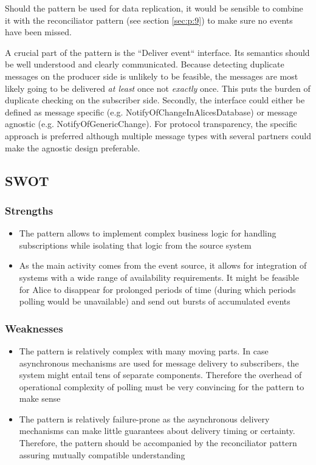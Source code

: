 \documentclass[10pt,a4paper]{article}
\begin{document}
Should the pattern be used for data replication, it would be sensible to combine it with the reconciliator pattern (see section \ref{sec:p:9}) to make sure no events have been missed.

A crucial part of the pattern is the ``Deliver event`` interface. Its semantics should be well understood and clearly communicated. Because detecting duplicate messages on the producer side is unlikely to be feasible, the messages are most likely going to be delivered \emph{at least} once not \emph{exactly} once. This puts the burden of duplicate checking on the subscriber side. Secondly, the interface could either be defined as message specific (e.g. NotifyOfChangeInAlicesDatabase) or message agnostic (e.g. NotifyOfGenericChange). For protocol transparency, the specific approach is preferred although multiple message types with several partners could make the agnostic design preferable.

\subsection{SWOT}
\subsubsection{Strengths}
\begin{itemize}
	\item The pattern allows to implement complex business logic for handling subscriptions while isolating that logic from the source system
	\item As the main activity comes from the event source, it allows for integration of systems with a wide range of availability requirements. It might be feasible for Alice to disappear for prolonged periods of time (during which periods polling would be unavailable) and send out bursts of accumulated events
\end{itemize}


\subsubsection{Weaknesses}
\begin{itemize}
	\item The pattern is relatively complex with many moving parts. In case asynchronous mechanisms are used for message delivery to subscribers, the system might entail tens of separate components. Therefore the overhead of operational complexity of polling must be very convincing for the pattern to make sense
	\item The pattern is relatively failure-prone as the asynchronous delivery mechanisms can make little guarantees about delivery timing or certainty. Therefore, the pattern should be accompanied by the reconciliator pattern assuring mutually compatible understanding
\end{itemize}
	
\end{document}
